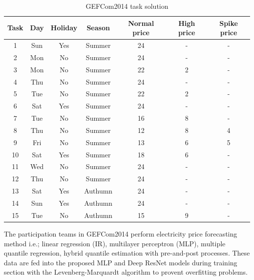 \documentclass[review]{elsarticle}
\begin{document}
      \begin{table}[H]
        \begin{center}
        \caption{GEFCom2014 task solution}
        \begin{adjustbox}{width=\textwidth}
          \begin{tabular}{|c|c|c|c|c|c|c|}
            \hline
            Task & Day & Holiday & Season & Normal price & High price & Spike price\\
            \hline
            1 & Sun & Yes & Summer & 24 & - & -\\
            2 & Mon & No & Summer & 24 & - & -\\
            3 & Mon & No & Summer & 22 & 2 & -\\
            4 & Thu & No & Summer & 24 & - & -\\
            5 & Tue & No & Summer & 22 & 2 & -\\
            6 & Sat & Yes & Summer & 24 & - & -\\
            7 & Tue & No & Summer & 16 & 8 & -\\
            8 & Thu & No & Summer & 12 & 8 & 4\\
            9 & Fri & No & Summer & 13 & 6 & 5\\
            10 & Sat & Yes & Summer & 18 & 6 & -\\
            11 & Wed & No & Summer & 24 & - & -\\
            12 & Thu & No & Summer & 24 & - & -\\
            13 & Sat & Yes & Authumn & 24 & - & -\\
            14 & Sun & Yes & Authumn & 24 & - & -\\
            15 & Tue & No & Authumn & 15 & 9 & -\\
            \hline
          \end{tabular}
        \end{adjustbox}
        \label{table:price_data_set}
        \end{center}
      \end{table}

      The participation teams in GEFCom2014 perform electricity price forecasting method i.e.; linear regression (IR)\cite{Dudek2016}, multilayer perceptron (MLP)\cite{Dudek2016},  multiple quantile regression\cite{Juban2016}, hybrid quantile estimation with pre-and-post processes\cite{Maciejowska2016}.
      These data are fed into the proposed MLP and Deep ResNet models during training section with the Levenberg-Marquardt algorithm to provent overfitting problems.
\end{document}
